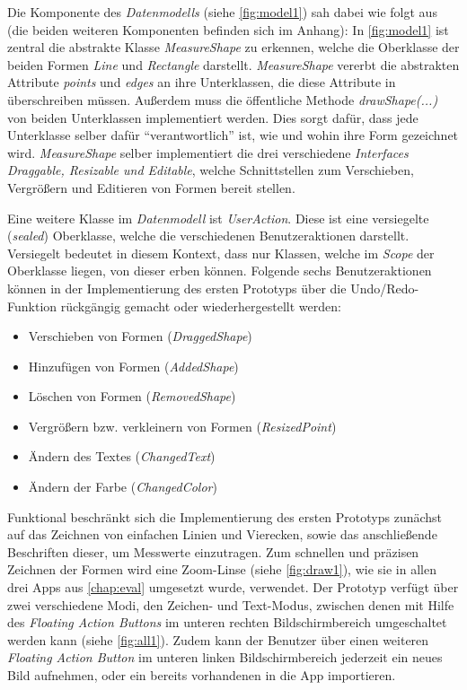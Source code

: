 \noindent
Die Komponente des \emph{Datenmodells} (siehe \autoref{fig:model1}) sah dabei wie folgt aus (die beiden weiteren Komponenten befinden sich im Anhang):
In \autoref{fig:model1} ist zentral die abstrakte Klasse \emph{MeasureShape} zu erkennen, welche die Oberklasse der beiden Formen \emph{Line} und \emph{Rectangle} darstellt.
\emph{MeasureShape} vererbt die abstrakten Attribute \emph{points} und \emph{edges} an ihre Unterklassen, die diese Attribute in überschreiben müssen.
Außerdem muss die öffentliche Methode \emph{drawShape(...)} von beiden Unterklassen implementiert werden.
Dies sorgt dafür, dass jede Unterklasse selber dafür ``verantwortlich'' ist, wie und wohin ihre Form gezeichnet wird.
\emph{MeasureShape} selber implementiert die drei verschiedene \emph{Interfaces} \emph{Draggable, Resizable und Editable}, welche Schnittstellen zum Verschieben, Vergrößern und Editieren von Formen bereit stellen. \\

\noindent
Eine weitere Klasse im \emph{Datenmodell} ist \emph{UserAction}.
Diese ist eine versiegelte (\emph{sealed}) Oberklasse, welche die verschiedenen Benutzeraktionen darstellt.
Versiegelt bedeutet in diesem Kontext, dass nur Klassen, welche im \emph{Scope} der Oberklasse liegen, von dieser erben können.
Folgende sechs Benutzeraktionen können in der Implementierung des ersten Prototyps über die Undo/Redo-Funktion rückgängig gemacht oder wiederhergestellt werden:

\begin{itemize}
  \item Verschieben von Formen (\emph{DraggedShape})
  \item Hinzufügen von Formen (\emph{AddedShape})
  \item Löschen von Formen (\emph{RemovedShape})
  \item Vergrößern bzw. verkleinern von Formen (\emph{ResizedPoint})
  \item Ändern des Textes (\emph{ChangedText})
  \item Ändern der Farbe (\emph{ChangedColor})
\end{itemize}

\noindent
Funktional beschränkt sich die Implementierung des ersten Prototyps zunächst auf das Zeichnen von einfachen Linien und Vierecken, sowie das anschließende Beschriften dieser, um Messwerte einzutragen.
Zum schnellen und präzisen Zeichnen der Formen wird eine Zoom-Linse (siehe \autoref{fig:draw1}), wie sie in allen drei Apps aus \autoref{chap:eval} umgesetzt wurde, verwendet.
Der Prototyp verfügt über zwei verschiedene Modi, den Zeichen- und Text-Modus, zwischen denen mit Hilfe des \emph{Floating Action Buttons} im unteren rechten Bildschirmbereich umgeschaltet werden kann (siehe \autoref{fig:all1}).
Zudem kann der Benutzer über einen weiteren \emph{Floating Action Button} im unteren linken Bildschirmbereich jederzeit ein neues Bild aufnehmen, oder ein bereits vorhandenen in die App importieren. \\

